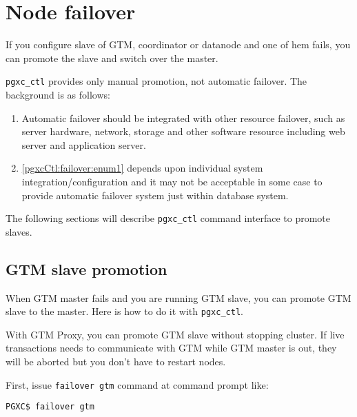 \chapter{Node failover}

  If you configure slave of GTM, coordinator or datanode and one of hem fails, you can promote
  the slave and switch over the master.
  
  \verb|pgxc_ctl| provides only manual promotion, not automatic failover.
  The background is as follows:
  
  \begin{enumerate}
	  \item \label{pgxcCtl:failover:enum1}Automatic failover should be integrated with other
	  		resource failover, such as server hardware, network, storage and other software
			resource including web server and application server.
	  \item \ref{pgxcCtl:failover:enum1} depends upon individual system integration/configuration
	  		and it may not be acceptable in some case to provide automatic failover system just
			within database system.
  \end{enumerate}
  
  The following sections will describe \verb|pgxc_ctl| command interface to promote slaves.



\section{GTM slave promotion}

  When GTM master fails and you are running GTM slave, you can promote GTM slave to
  the master.
  Here is how to do it with \verb|pgxc_ctl|.
  
  
    With GTM Proxy, you can promote GTM slave without stopping \XC{} cluster.
    If  live transactions needs to communicate with GTM while GTM master is out, they
	will be aborted but you don't have to restart nodes.
    
    First, issue \texttt{failover gtm} command at  command prompt like:
    
	\vspace{\parskip}
    \begin{lstlisting}[basicstyle=\ttfamily\normalsize,frame=single]
PGXC$ failover gtm
    \end{lstlisting}
    
